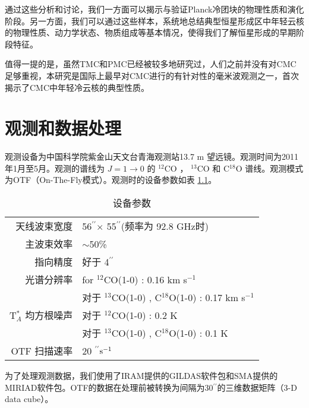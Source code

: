 \documentclass[UTF8]{pkuthss}
\newcommand{\coa}{$^{12}$CO }
\newcommand{\cob}{$^{13}$CO }
\newcommand{\coc}{C$^{18}$O }
\newcommand{\coaa}{$^{12}$CO(1-0) }
\newcommand{\cobb}{$^{13}$CO(1-0) }
\newcommand{\cocc}{C$^{18}$O(1-0) }
\newcommand{\kms}{km s$^{-1}$}
\newcommand{\arcsec}{$^{\prime\prime}$}
\begin{document}
		通过这些分析和讨论，我们一方面可以揭示与验证Planck冷团块的物理性质和演化阶段。另一方面，我们可以通过这些样本，系统地总结典型恒星形成区中年轻云核的物理性质、动力学状态、物质组成等基本情况，使得我们了解恒星形成的早期阶段特征。

		值得一提的是，虽然TMC和PMC已经被较多地研究过，人们之前并没有对CMC足够重视，本研究是国际上最早对CMC进行的有针对性的毫米波观测之一，首次揭示了CMC中年轻冷云核的典型性质。

\chapter{观测和数据处理}
		
		观测设备为中国科学院紫金山天文台青海观测站13.7 m 望远镜。观测时间为2011年1月至5月。观测的谱线为 $J=1 \rightarrow 0 $ 的  \coa， \cob 和 \coc 谱线。观测模式为OTF（On-The-Fly模式）。观测时的设备参数如表 \ref{Fig.Observation}。

		\begin{table}[H]
        \centering
        \caption{设备参数\label{Fig.Observation}}
        \setlength{\tabcolsep}{0.1in}
        \vspace{0.5em}
        \begin{tabular}{rl}
        \toprule
        \hline
        天线波束宽度 & 56\arcsec$\times$ 55\arcsec (频率为 92.8 GHz时) \\
        主波束效率 & $\sim$50\%                               \\
        指向精度   & 好于 4\arcsec                     \\
        光谱分辨率  & for \coaa: 0.16 \kms                     \\
                             & 对于 \cobb, \cocc:  0.17 \kms           \\
        T$^*_A$ 均方根噪声    & 对于 \coaa: 0.2 K                         \\
                             & 对于 \cobb, \cocc: 0.1 K               \\
        OTF 扫描速率          & 20 \arcsec $\rm s^{-1}$\\
        \hline
        \bottomrule
        \end{tabular}
        \end{table}


        为了处理观测数据，我们使用了IRAM提供的GILDAS软件包\supercite{2000ASPC..217..299G}和SMA提供的MIRIAD软件包\supercite{1995ASPC...77..433S}。OTF的数据在处理前被转换为间隔为30\arcsec 的三维数据矩阵（3-D data cube）。
\end{document}
